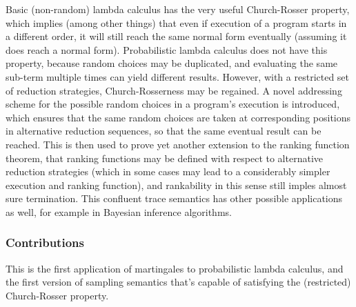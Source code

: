 Basic (non-random) lambda calculus has the very useful Church-Rosser property, which implies (among other things) that even if execution of a program starts in a different order, it will still reach the same normal form eventually (assuming it does reach a normal form). Probabilistic lambda calculus does not have this property, because random choices may be duplicated, and evaluating the same sub-term multiple times can yield different results. However, with a restricted set of reduction strategies, Church-Rosserness may be regained. A novel addressing scheme for the possible random choices in a program's execution is introduced, which ensures that the same random choices are taken at corresponding positions in alternative reduction sequences, so that the same eventual result can be reached. This is then used to prove yet another extension to the ranking function theorem, that ranking functions may be defined with respect to alternative reduction strategies (which in some cases may lead to a considerably simpler execution and ranking function), and rankability in this sense still imples almost sure termination. This confluent trace semantics has other possible applications as well, for example in Bayesian inference algorithms.

\subsubsection*{Contributions}

This is the first application of martingales to probabilistic lambda calculus, and the first version of sampling semantics that's capable of satisfying the (restricted) Church-Rosser property.
